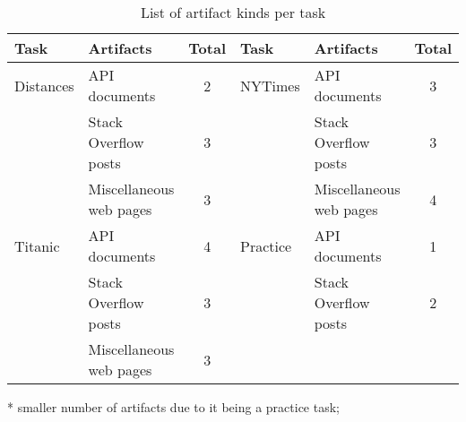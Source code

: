 


\begin{table}
\centering
\caption{List of artifact kinds per task}
\begin{scriptsize}
\begin{threeparttable}
\begin{tabular}{llcllc}
\hline
\textbf{Task} & \textbf{Artifacts} & \textbf{Total} & \textbf{Task} & \textbf{Artifacts} & \textbf{Total}                                                                              \\
\hline
\hline
%
%
\parbox[l][0.5cm][c]{1cm}{Distances}    & API documents             & 2  & \parbox[l][0.5cm][c]{1cm}{NYTimes}      & API documents             & 3 \\
\parbox[l][0.5cm][c]{1cm}{}             & Stack Overflow posts      & 3 & \parbox[l][0.5cm][c]{1cm}{}             & Stack Overflow posts      & 3 \\
\parbox[l][0.5cm][c]{1cm}{}             & Miscellaneous web pages   & 3 & \parbox[l][0.5cm][c]{1cm}{}             & Miscellaneous web pages   & 4 \\
\hline

\parbox[l][0.5cm][c]{1cm}{Titanic}      & API documents             & 4 & \parbox[l][0.5cm][c]{1cm}{Practice\tnote{*}}      & API documents             & 1 \\
\parbox[l][0.5cm][c]{1cm}{}             & Stack Overflow posts      & 3 & \parbox[l][0.5cm][c]{1cm}{}             & Stack Overflow posts      & 2 \\
\parbox[l][0.5cm][c]{1cm}{}             & Miscellaneous web pages   & 3 \\
\hline


\end{tabular}
\begin{tablenotes}
    \item[*] smaller number of artifacts due to it being a practice task;
\end{tablenotes}
\end{threeparttable}
\end{scriptsize}
\label{tbl:python-task-distribution}
\end{table}






